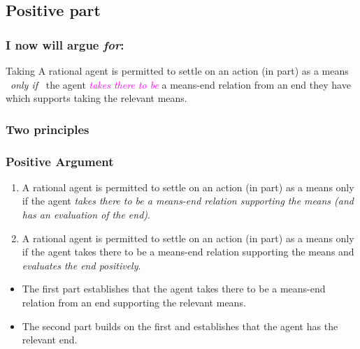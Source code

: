\documentclass[noamssymb,
]{beamer} %
\newcommand{\hozlinedash}[0]{%
  \noindent\hdashrule[0.5ex][c]{\textwidth}{.1pt}{2.5pt}
}
\begin{document}
\subsection{Positive part}
\label{sec:positive}

\begin{frame}
  \frametitle{I now will argue \emph{for}:}

  \begin{block}{Taking}
    A rational agent is permitted to settle on an action (in part) as a means
    \newline
    \mbox{ }\hfill\emph{only if}\hfill\mbox{ }
    \newline
    the agent \textcolor{fuchsia}{\emph{takes there to be}} a means-end relation from an end they have which supports taking the relevant means.
  \end{block}
\end{frame}

\subsubsection{Two principles}
\label{sec:two-principles}

\begin{frame}
    \frametitle{Positive Argument}

    \begin{enumerate}
    \item A rational agent is permitted to settle on an action (in part) as a means only if the agent \emph{takes there to be a means-end relation supporting the means (and has an evaluation of the end)}.
    \item A rational agent is permitted to settle on an action (in part) as a means only if the agent takes there to be a means-end relation supporting the means and \emph{evaluates the end positively}.
    \end{enumerate}
    \begin{itemize}
    \item The first part establishes that the agent takes there to be a means-end relation from an end supporting the relevant means.
    \item The second part builds on the first and establishes that the agent has the relevant end.
    \end{itemize}

\end{frame}
\end{document}

